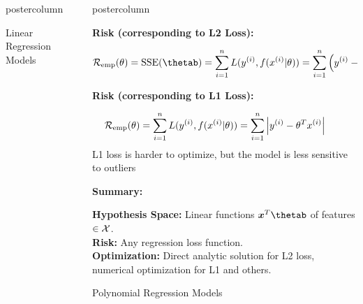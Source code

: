 \documentclass{beamer}
\newlength{\columnheight} %
\begin{document}
\begin{frame}[fragile]{}
\begin{columns}
\begin{column}{.31\textwidth}
\begin{beamercolorbox}[center]{postercolumn}
\begin{minipage}{.98\textwidth}
{\begin{myblock}{Linear Regression Models}
					\hspace*{1ex}
					\end{myblock}\vfill
				}
			\end{minipage}
		\end{beamercolorbox}
	\end{column}
	\begin{column}{.31\textwidth}
		\begin{beamercolorbox}[center]{postercolumn}
			\begin{minipage}{.98\textwidth}
				\parbox[t][\columnheight]{\textwidth}{
				\begin{myblock}{ }
					\begin{codebox}
					\textbf{Risk (corresponding to \textbf{L2 Loss}):}	\end{codebox} 
				\[\risket = \operatorname{SSE}(\thetab) = \sumin \Lxyit = \sumin \left(\yi - \thetab^T \xi\right)^2\]
                
                \begin{codebox}
					\textbf{Risk (corresponding to \textbf{L1 Loss}):}
				\end{codebox}
				
				\[
                \mathcal{R}_{\text{emp}}(\theta) = \sum_{i=1}^n L(y^{(i)}, f(x^{(i)} | \theta)) = \sum_{i=1}^n \left|y^{(i)} - \theta^T x^{(i)}\right| \qquad
                \]
                L1 loss is harder to optimize, but the model is less sensitive to outliers
                
                \hspace*{1ex}
				
				\begin{codebox}
					\textbf{Summary:}
				\end{codebox}
            \textbf{Hypothesis Space:} Linear functions $\xv^T\thetab$ of features $\in \mathcal{X}$.\\
            

            \textbf{Risk:} Any regression loss function.\\
           
            \textbf{Optimization:} Direct analytic solution for L2 loss, numerical optimization for L1 and others.\\
			\end{myblock}
						\begin{myblock}{Polynomial Regression Models}
			

\end{myblock}}
\end{minipage}
\end{beamercolorbox}
\end{column}
\end{columns}
\end{frame}
\end{document}
